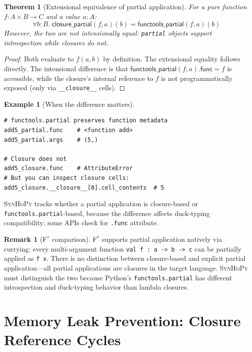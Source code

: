 \documentclass[11pt,a4paper]{report}
\theoremstyle{definition}
\newtheorem{example}[definition]{Example}
\newtheorem{remark}[definition]{Remark}
\theoremstyle{plain}
\newtheorem{theorem}[definition]{Theorem}
\newcommand{\fstar}{F$^{*}$}
\newcommand{\synhopy}{\textsc{SynHoPy}}
\begin{document}
\begin{theorem}[Extensional equivalence of partial application]
For a pure function $f : A \times B \to C$ and a value $a : A$:
\[
  \forall b : B.\;
  \mathsf{closure\_partial}(f, a)(b) = \mathsf{functools\_partial}(f, a)(b)
\]
However, the two are not intensionally equal: \texttt{partial} objects
support introspection while closures do not.
\end{theorem}
\begin{proof}
Both evaluate to $f(a, b)$ by definition.  The extensional equality
follows directly.  The intensional difference is that
$\mathsf{functools\_partial}(f, a).\mathsf{func} = f$ is accessible,
while the closure's internal reference to $f$ is not programmatically
exposed (only via \texttt{\_\_closure\_\_} cells).
\end{proof}

\begin{example}[When the difference matters]
\begin{lstlisting}[style=python]
# functools.partial preserves function metadata
add5_partial.func    # <function add>
add5_partial.args    # (5,)

# Closure does not
add5_closure.func    # AttributeError
# But you can inspect closure cells:
add5_closure.__closure__[0].cell_contents  # 5
\end{lstlisting}
\synhopy{} tracks whether a partial application is closure-based or
\texttt{functools.partial}-based, because the difference affects
duck-typing compatibility: some APIs check for \texttt{.func} attribute.
\end{example}

\begin{remark}[\fstar{} comparison]
\fstar{} supports partial application natively via currying: every multi-argument
function \lstinline[style=fstar]|val f : a -> b -> c| can be partially applied
as \lstinline[style=fstar]|f x|.  There is no distinction between closure-based
and explicit partial application---all partial applications are closures in the
target language.  \synhopy{} must distinguish the two because Python's
\texttt{functools.partial} has different introspection and duck-typing behavior
than lambda closures.
\end{remark}

\section{Memory Leak Prevention: Closure Reference Cycles}
\end{document}
